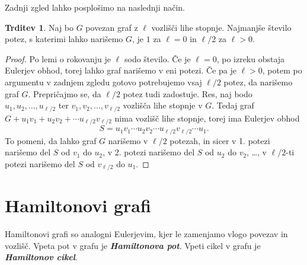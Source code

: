 \documentclass[11pt]{book}
\def\definicija{\color{rdeca}\bf\em}
\theoremstyle{definition}
\theoremstyle{zgled}
\theoremstyle{odprtproblem}
\theoremstyle{domacanaloga}
\newenvironment{dokaz}
    {\color{siva}\begin{proof}}
    {\end{proof}}
\theoremstyle{izrek}
\newtheorem*{trditev}{Trditev}
\begin{document}
Zadnji zgled lahko posplošimo na naslednji način.

\begin{trditev}
Naj bo $G$ povezan graf z $\ell$ vozlišči lihe stopnje. Najmanjše število potez, s katerimi lahko narišemo $G$, je $1$ za $\ell = 0$ in $\ell/2$ za $\ell > 0$.
\end{trditev}
\begin{dokaz}
Po lemi o rokovanju je $\ell$ sodo število. Če je $\ell = 0$, po izreku obstaja Eulerjev obhod, torej lahko graf narišemo v eni potezi. Če pa je $\ell > 0$, potem po argumentu v zadnjem zgledu gotovo potrebujemo vsaj $\ell/2$ potez, da narišemo graf $G$. Prepričajmo se, da $\ell/2$ potez tudi zadostuje. Res, naj bodo $u_1, u_2, \dots, u_{\ell/2}$ ter $v_1, v_2, \dots, v_{\ell/2}$ vozlišča lihe stopnje v $G$. Tedaj graf $G + u_1 v_1 + u_2 v_2 + \cdots u_{\ell/2} v_{\ell/2}$ nima vozlišč lihe stopnje, torej ima Eulerjev obhod
\[
    S = u_1 v_1 \cdots u_2 v_2 \cdots u_{\ell/2} v_{\ell/2} \cdots u_1.
\]
To pomeni, da lahko graf $G$ narišemo v $\ell/2$ potezah, in sicer v 1. potezi narišemo del $S$ od $v_1$ do $u_2$, v 2. potezi narišemo del $S$ od $u_2$ do $v_2$, \dots, v $\ell/2$-ti potezi narišemo del $S$ od $v_{\ell/2}$ do $u_1$.
\end{dokaz}

\section{Hamiltonovi grafi}

Hamiltonovi grafi so analogni Eulerjevim, kjer le zamenjamo vlogo povezav in vozlišč. Vpeta pot v grafu je {\definicija Hamiltonova pot}. Vpeti cikel v grafu je {\definicija Hamiltonov cikel}. 
\end{document}
